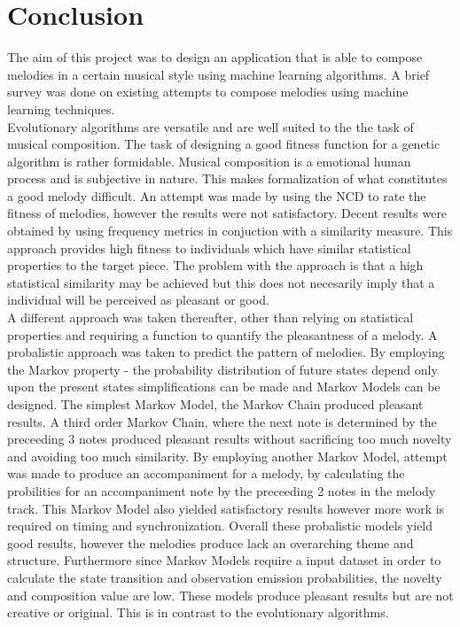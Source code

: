 \chapter{Conclusion}
The aim of this project was to design an application that is able to compose melodies in a certain musical style using machine learning algorithms. A brief survey was done on existing attempts to compose melodies using machine learning techniques.
\\

Evolutionary algorithms are versatile and are well suited to the the task of musical composition. The task of designing a good fitness function for a genetic algorithm is rather formidable.
Musical composition is a emotional human process and is subjective in nature. This makes formalization of what constitutes a good melody difficult. 
An attempt was made by using the \ac{NCD} to rate the fitness of melodies, however the results were not satisfactory.
Decent results were obtained by using frequency metrics in conjuction with a similarity measure. This approach provides high fitness to individuals which have similar statistical properties to the target piece. The problem with the approach is that a high statistical similarity may be achieved but this does not necesarily imply that a individual will be perceived as pleasant or good.
\\

A different approach was taken thereafter, other than relying on statistical properties and requiring a function to quantify the pleasantness of a melody. A probalistic approach was taken to predict the pattern of melodies. By employing the Markov property - the probability distribution of future states depend only upon the present states simplifications can be made and Markov Models can be designed. The simplest Markov Model, the Markov Chain produced pleasant results. A third order Markov Chain, where the next note is determined by the preceeding 3 notes produced pleasant results without sacrificing too much novelty and avoiding too much similarity. By employing another Markov Model, attempt was made to produce an accompaniment for a melody, by calculating the probilities for an accompaniment note by the preceeding 2 notes in the melody track. This Markov Model also yielded satisfactory results however more work is required on timing and synchronization.
Overall these probalistic models yield good results, however the melodies produce lack an overarching theme and structure. Furthermore since Markov Models require a input dataset in order to calculate the state transition and observation emission probabilities, the novelty and composition value are low. These models produce pleasant results but are not creative or original. This is in contrast to the evolutionary algorithms.
\\

